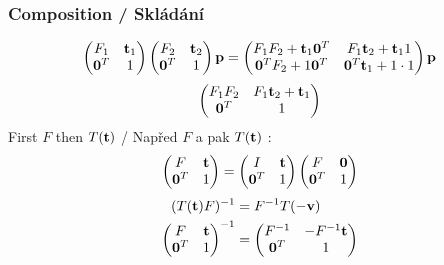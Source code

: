 \begin{frame}\frametitle{Composition / Skládání}
  \begin{equation*}
    \begin{pmatrix}
      F_1 & \mathbf{t}_1 \\
      \mathbf{0}^T & 1
    \end{pmatrix}
    \begin{pmatrix}
      F_2 & \mathbf{t}_2 \\
      \mathbf{0}^T & 1
    \end{pmatrix}\mathbf{p}
    = \begin{pmatrix}
      F_1F_2 + \mathbf{t}_1\mathbf{0}^T & F_1\mathbf{t}_2 + \mathbf{t}_11 \\
      \mathbf{0}^TF_2 + 1\mathbf{0}^T & \mathbf{0}^T\mathbf{t}_1 + 1\cdot1
    \end{pmatrix}\mathbf{p}
  \end{equation*}
  \pause
  \begin{equation*}
    \begin{pmatrix}
      F_1F_2 & F_1\mathbf{t}_2 + \mathbf{t}_1 \\
      \mathbf{0}^T & 1
    \end{pmatrix}
  \end{equation*}
  \pause\vfill
  First $F$ then $T(\mathbf{t})$ / Napřed $F$ a pak $T(\mathbf{t})$ :
  \begin{equation*}
    \begin{pmatrix}
      F & \mathbf{t} \\
      \mathbf{0}^T & 1
    \end{pmatrix}
    =\begin{pmatrix}
      I & \mathbf{t} \\
      \mathbf{0}^T & 1
    \end{pmatrix}
    \begin{pmatrix}
      F & \mathbf{0} \\
      \mathbf{0}^T & 1
    \end{pmatrix}
  \end{equation*}
  \pause\vfill
  \begin{align*}
    (T(\mathbf{t})F)^{-1} &= F^{-1}T(-\mathbf{v}) \\
    \begin{pmatrix}
      F & \mathbf{t} \\
      \mathbf{0}^T & 1
    \end{pmatrix}^{-1}
    &= \begin{pmatrix}
      F^{-1} & -F^{-1}\mathbf{t} \\
      \mathbf{0}^T & 1
    \end{pmatrix}
  \end{align*}
\end{frame}

